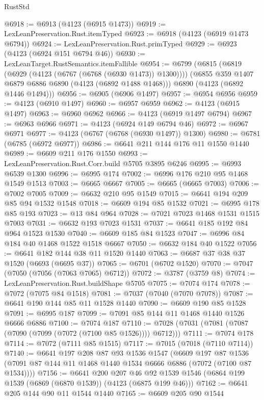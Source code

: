 \begin{lexlean}{RustStd}
\begin{coremodule}
@6918 := @6913 (@4123 (@6915 @1473))
@6919 := LexLeanPreservation.Rust.itemTyped
@6923 := @6918 (@4123 (@6919 @1473 @6794))
@6924 := LexLeanPreservation.Rust.primTyped
@6929 := @6923 (@4123 (@6924 @151 @6794 @46))
@6930 := LexLeanTarget.RustSemantics.itemFallible
@6954 := @6799
    (@6815
      (@6819 (@6929 (@4123 (@6767 (@6768 (@6930 @1473)) @1300))))
      (@6855 @359 @1407 @6879 @6886 @6890 (@4123 (@6892 @1488 @1468)))
      @6890
      (@4123 (@6892 @1446 @1494)))
@6956 := @6905 (@6906 @1497)
@6957 := @6954 @6956
@6959 := @4123 (@6910 @1497)
@6960 := @6957 @6959
@6962 := @4123 (@6915 @1497)
@6963 := @6960 @6962
@6966 := @4123 (@6919 @1497 @6794)
@6967 := @6963 @6966
@6971 := @4123 (@6924 @149 @6794 @46)
@6972 := @6967 @6971
@6977 := @4123 (@6767 (@6768 (@6930 @1497)) @1300)
@6980 := @6781 (@6785 (@6972 @6977))
@6986 := @6641 @211 @144 @176 @11 @1550 @1440
@6989 := @6609 @211 @176 @1550
@6993 := LexLeanPreservation.Rust.Corr.build @5705 @3895 @6246
@6995 := @6993 @6539 @1300
@6996 := @6995 @174
@7002 := @6996 @176 @210 @95 @1468 @1549 @1513
@7003 := @6665 @6667
@7005 := @6665 (@6665 @7003)
@7006 := @7002 @7005
@7009 := @6632 @210 @95 @1549
@7015 := @6641 @194 @209 @85 @94 @1532 @1548
@7018 := @6609 @194 @85 @1532
@7021 := @6995 @178 @85 @193
@7023 := @13 @84 @964
@7028 := @7021 @7023 @1468 @1531 @1515 @7003
@7031 := @6632 @193 @7023 @1531
@7037 := @6641 @185 @192 @84 @964 @1523 @1530
@7040 := @6609 @185 @84 @1523
@7047 := @6996 @84 @184 @40 @1468 @1522 @1518 @6667
@7050 := @6632 @184 @40 @1522
@7056 := @6641 @182 @144 @38 @11 @1520 @1440
@7063 := @6687 @37 @38 @37 @1520 (@6693 (@6695 @37))
@7065 := @6701 (@6702 @1520)
@7070 := @7047 (@7050 (@7056 (@7063 @7065) @6712))
@7072 := @3787 (@3759 @8)
@7074 := LexLeanPreservation.Rust.buildShape @5705
@7075 := @7074 @174
@7078 := @7072 (@7075 @84 @1518)
@7081 := @7037 (@7040 (@7070 @7078))
@7087 := @6641 @190 @144 @85 @11 @1528 @1440
@7090 := @6609 @190 @85 @1528
@7091 := @6995 @187
@7099 := @7091 @85 @144 @11 @1468 @1440 @1526 @6666 @6886
@7100 := @7074 @187
@7110 := @7028 (@7031 (@7081 (@7087 (@7090 (@7099 (@7072 (@7100 @85 @1526)))) @6712)))
@7111 := @7074 @178
@7114 := @7072 (@7111 @85 @1515)
@7117 := @7015 (@7018 (@7110 @7114))
@7140 := @6641
    @197
    @208
    @87
    @93
    @1536
    @1547
    (@6609
      @197
      @87
      @1536
      (@7091 @87 @144 @11 @1468 @1440 @1534 @6666 @6886 (@7072 (@7100 @87 @1534))))
@7156 := @6641
    @200
    @207
    @46
    @92
    @1539
    @1546
    (@6864 @199 @1539 (@6869 (@6870 @1539)) (@4123 (@6875 @199 @46)))
@7162 := @6641 @205 @144 @90 @11 @1544 @1440
@7165 := @6609 @205 @90 @1544

\end{coremodule}
\end{lexlean}
